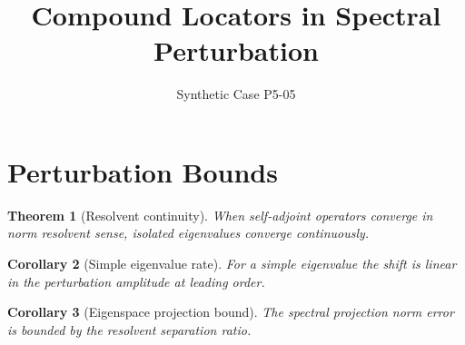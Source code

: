 \documentclass{article}
\title{Compound Locators in Spectral Perturbation}
\author{Synthetic Case P5-05}
\newtheorem{thm}{Theorem}[section]
\newtheorem{cor}[thm]{Corollary}
\begin{document}
\maketitle

\section{Perturbation Bounds}
\label{sec:perturb}

\begin{thm}[Resolvent continuity]
\label{thm:resolvent}
When self-adjoint operators converge in norm resolvent sense, isolated eigenvalues converge continuously.
\end{thm}

\begin{cor}[Simple eigenvalue rate]
\label{cor:simple-rate}
For a simple eigenvalue the shift is linear in the perturbation amplitude at leading order.
\end{cor}

\begin{cor}[Eigenspace projection bound]
\label{cor:proj-bound}
The spectral projection norm error is bounded by the resolvent separation ratio.
\end{cor}
\end{document}

